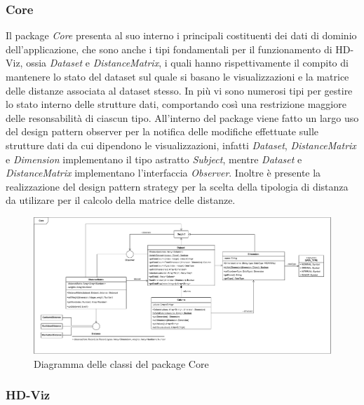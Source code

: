 \documentclass[../manuale_sviluppatore.tex]{subfiles}
\begin{document}
\newpage

\subsubsection*{Core}

Il package \emph{Core} presenta al suo interno i principali costituenti dei dati di dominio 
dell'applicazione, che sono anche i tipi fondamentali per il funzionamento di HD-Viz, ossia 
\emph{Dataset} e \emph{DistanceMatrix}, i quali hanno rispettivamente il compito di mantenere lo 
stato del dataset sul quale si basano le visualizzazioni e la matrice delle distanze associata al 
dataset stesso. In più vi sono numerosi tipi per gestire lo stato interno delle strutture dati, 
comportando così una restrizione maggiore delle resonsabilità di ciascun tipo. All'interno del 
package viene fatto un largo uso del design pattern observer per la notifica delle modifiche 
effettuate sulle strutture dati da cui dipendono le visualizzazioni, infatti \emph{Dataset}, 
\emph{DistanceMatrix} e \emph{Dimension} implementano il tipo astratto \emph{Subject}, mentre 
\emph{Dataset} e \emph{DistanceMatrix} implementano l'interfaccia \emph{Observer}. Inoltre è 
presente la realizzazione del design pattern strategy per la scelta della tipologia di distanza da 
utilizare per il calcolo della matrice delle distanze.

\begin{figure}[H]
	\centering
	\includegraphics[width=18cm]{src/img/core.pdf}
	\caption{Diagramma delle classi del package Core}
\end{figure}

\subsubsection*{HD-Viz}
\end{document}
